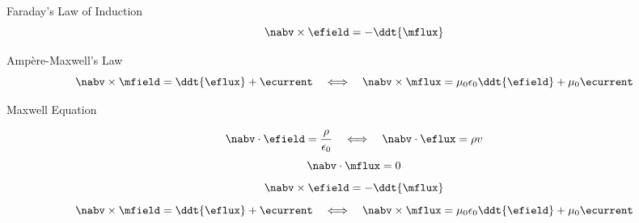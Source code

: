 \begin{frame}{Faraday's Law of Induction}
    \vspace{-10pt}
    \begin{equation}
        \nabv \times \efield = -\ddt{\mflux}
    \end{equation}
\end{frame}

\begin{frame}{Ampère-Maxwell's Law}
    \vspace{-10pt}
    \begin{equation}
        \nabv \times \mfield = \ddt{\eflux} + \ecurrent
        \hspace{1em} \Longleftrightarrow \hspace{1.0em}
        \nabv \times \mflux = \mu_0 \epsilon_0 \ddt{\efield} + \mu_0 \ecurrent
    \end{equation}
\end{frame}

\begin{frame}{Maxwell Equation}
    \begin{twocolumns}[0.3]
    \leftcol
    \rightcol
        \vspace{-8pt}
        \begin{equation}
                \nabv \cdot \efield = \frac{\rho}{\epsilon_0}
                \hspace{1em} \Longleftrightarrow \hspace{1.0em}
                \nabv \cdot \eflux = \rho v
        \end{equation}
        \vspace{-8pt}
        \begin{equation}
            \nabv \cdot \mflux = 0
        \end{equation}
        \vspace{-10pt}
        \begin{equation}
            \nabv \times \efield = -\ddt{\mflux}
        \end{equation}
        \vspace{-10pt}
        \begin{equation}
            \nabv \times \mfield = \ddt{\eflux} + \ecurrent
            \hspace{1em} \Longleftrightarrow \hspace{1.0em}
            \nabv \times \mflux = \mu_0 \epsilon_0 \ddt{\efield} + \mu_0 \ecurrent
        \end{equation}
 \end{twocolumns}
\end{frame}

